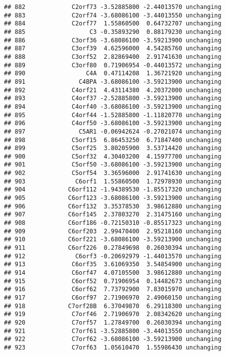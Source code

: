 \documentclass[]{article}
\begin{document}
\begin{verbatim}
## 882             C2orf73 -3.52885800 -2.44013570 unchanging
## 883             C2orf74 -3.68086100 -3.44013550 unchanging
## 884             C2orf77  1.55860500  0.64732707 unchanging
## 885                  C3 -0.35893290  0.88179230 unchanging
## 886             C3orf36 -3.68086100 -3.59213900 unchanging
## 887             C3orf39  4.62596000  4.54285760 unchanging
## 888             C3orf52  2.82869400  2.91741630 unchanging
## 889             C3orf80  0.71906954 -0.44013572 unchanging
## 890                 C4A  0.47114208  1.36721920 unchanging
## 891               C4BPA -3.68086100 -3.59213900 unchanging
## 892             C4orf21  4.43114380  4.20372000 unchanging
## 893             C4orf37 -2.52885800 -3.59213900 unchanging
## 894             C4orf40 -3.68086100 -3.59213900 unchanging
## 895             C4orf44 -1.52885800 -1.11820770 unchanging
## 896             C4orf50 -3.68086100 -3.59213900 unchanging
## 897               C5AR1 -0.06942624 -0.27021074 unchanging
## 898             C5orf15  6.86453250  6.71847400 unchanging
## 899             C5orf25  3.80205900  3.53714420 unchanging
## 900             C5orf32  4.30403200  4.15977700 unchanging
## 901             C5orf50 -3.68086100 -3.59213900 unchanging
## 902             C5orf54  3.36596000  2.91741630 unchanging
## 903              C6orf1  1.55860500  1.72978930 unchanging
## 904            C6orf112 -1.94389530 -1.85517320 unchanging
## 905            C6orf123 -3.68086100 -3.59213900 unchanging
## 906            C6orf132  3.35378530  3.98612880 unchanging
## 907            C6orf145  2.37803270  2.31475160 unchanging
## 908            C6orf186 -0.72150310 -0.85517323 unchanging
## 909            C6orf203  2.99470400  2.95218160 unchanging
## 910            C6orf221 -3.68086100 -3.59213900 unchanging
## 911            C6orf226  0.27849698  0.26030394 unchanging
## 912              C6orf3 -0.20692979 -1.44013570 unchanging
## 913             C6orf35  3.61069350  3.54854900 unchanging
## 914             C6orf47  4.07105500  3.98612880 unchanging
## 915             C6orf52  0.71906954  0.14482673 unchanging
## 916             C6orf62  7.73792900  7.83015970 unchanging
## 917             C6orf97  2.71906970  2.49060150 unchanging
## 918            C7orf28B  6.37049870  6.29118300 unchanging
## 919             C7orf46  2.71906970  2.08342620 unchanging
## 920             C7orf57  1.27849700  0.26030394 unchanging
## 921             C7orf61 -3.52885800 -3.44013550 unchanging
## 922             C7orf62 -3.68086100 -3.59213900 unchanging
## 923             C7orf63  1.05610470  1.55986430 unchanging

\end{verbatim}
\end{document}
